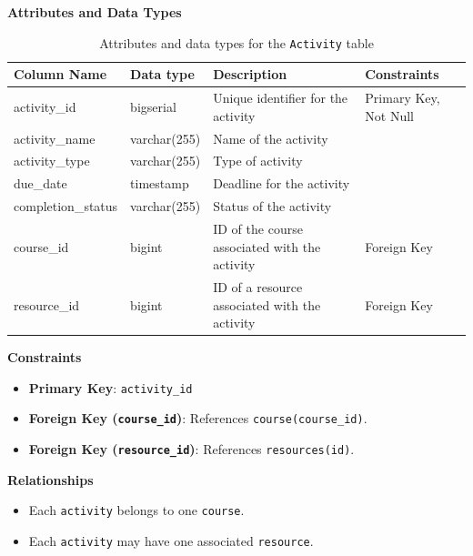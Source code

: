 \documentclass[12pt]{article}
\begin{document}
\textbf{Attributes and Data Types}
\begin{table}[H]
    \centering
    \renewcommand{\arraystretch}{1.5}
    \begin{tabular}{|l|l|p{4.5cm}|l|}
    \hline
    \rowcolor[HTML]{96FFFB} 
    \textbf{Column Name} & \textbf{Data type}      & \textbf{Description}                          & \textbf{Constraints}  \\ \hline
    activity\_id         & bigserial               & Unique identifier for the activity            & Primary Key, Not Null \\ \hline
    activity\_name       & varchar(255)            & Name of the activity                          &                       \\ \hline
    activity\_type       & varchar(255)            & Type of activity                              &                       \\ \hline
    due\_date            & timestamp               & Deadline for the activity                     &                       \\ \hline
    completion\_status   & varchar(255)            & Status of the activity                        &                       \\ \hline
    course\_id           & bigint                  & ID of the course associated with the activity & Foreign Key           \\ \hline
    resource\_id         & bigint                  & ID of a resource associated with the activity & Foreign Key           \\ \hline
    \end{tabular}
    \caption{Attributes and data types for the \texttt{Activity} table}
\end{table}

\noindent
\textbf{Constraints}
\begin{itemize}
    \item \textbf{Primary Key}: \texttt{activity\_id}
    \item \textbf{Foreign Key (\texttt{course\_id})}: References \texttt{course(course\_id)}.
    \item \textbf{Foreign Key (\texttt{resource\_id})}: References \texttt{resources(id)}.
\end{itemize}

\noindent
\textbf{Relationships}
\begin{itemize}
    \item Each \texttt{activity} belongs to one \texttt{course}.
    \item Each \texttt{activity} may have one associated \texttt{resource}.
\end{itemize}
\end{document}
